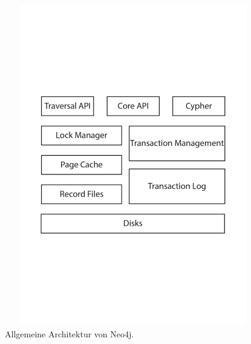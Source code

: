 \begin{figure}[th]
	\centering
	\includegraphics [width=13cm, height=14cm]{Figures/Architecure}
	\caption[Architecture]{Allgemeine Architektur von Neo4j.}
	\label{fig:Architecure}
\end{figure}

